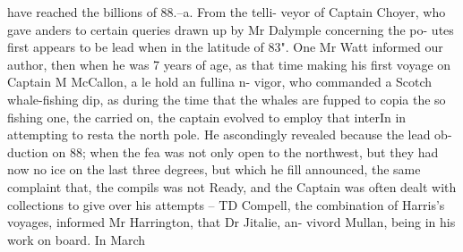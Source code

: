 have reached the billions of 88.--a. From the telli-
veyor of Captain Choyer, who gave anders to certain
queries drawn up by Mr Dalymple concerning the po-
utes first appears to be lead when in the latitude of 83". One Mr Watt informed our author, then when he was 7 years of age, as that time making his first voyage on Captain M McCallon, a le hold an fullina n-
vigor, who commanded a Scotch whale-fishing dip, as during the time that the whales are fupped to copia the so fishing one, the carried on, the captain evolved to employ that interIn in attempting to resta the north pole. He ascondingly revealed because the lead ob-
duction on 88; when the fea was not only open to the northwest, but they had now no ice on the last three degrees, but which he fill announced, the same complaint that, the compils was not Ready, and the Captain was often dealt with collections to give over his attempts – TD Compell, the combination of Harris’s voyages, informed Mr Harrington, that Dr Jitalie, an-
vivord Mullan, being in his work on board. In March

